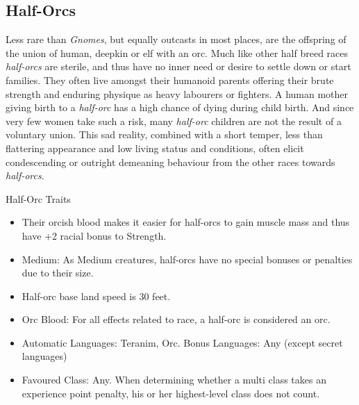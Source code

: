 \subsection{Half-Orcs}
\label{sec:Half-Orcs}

Less rare than \emph{Gnomes}, but equally outcasts in most places, are the
offspring of the union of human, deepkin or elf with an orc. Much like other
half breed races \emph{half-orcs} are sterile, and thus have no inner need or
desire to settle down or start families. They often live amongst their humanoid
parents offering their brute strength and enduring physique as heavy labourers
or fighters. A human mother giving birth to a \emph{half-orc} has a high
chance of dying during child birth. And since very few women take such a risk,
many \emph{half-orc} children are not the result of a voluntary union. This
sad reality, combined with a short temper, less than flattering appearance and
low living status and conditions, often elicit condescending or outright
demeaning behaviour from the other races towards \emph{half-orcs}.

\begin{35e}{Half-Orc Traits}
  \begin{itemize}[noitemsep]
    \item Their orcish blood makes it easier for half-orcs to gain muscle mass
      and thus have +2 racial bonus to Strength.
    \item Medium: As Medium creatures, half-orcs have no special bonuses or
      penalties due to their size.
    \item Half-orc base land speed is 30 feet.
    \item Orc Blood: For all effects related to race, a half-orc is considered
    an orc.
    \item Automatic Languages: Teranim, Orc. Bonus Languages: Any (except secret
      languages)
    \item Favoured Class: Any. When determining whether a multi class takes an
    experience point penalty, his or her highest-level class does not count.
  \end{itemize}
\end{35e}
